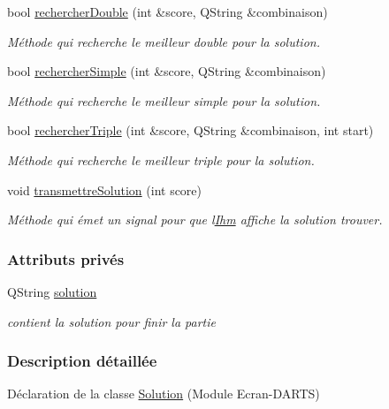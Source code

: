 \begin{DoxyCompactItemize}
bool \hyperlink{class_solution_aa54574bee5bde60d55a9da346a61cf48}{rechercher\+Double} (int \&score, Q\+String \&combinaison)
\begin{DoxyCompactList}\small\item\em Méthode qui recherche le meilleur double pour la solution. \end{DoxyCompactList}\item 
bool \hyperlink{class_solution_ab8223455a5a35aceb7de18970f94db48}{rechercher\+Simple} (int \&score, Q\+String \&combinaison)
\begin{DoxyCompactList}\small\item\em Méthode qui recherche le meilleur simple pour la solution. \end{DoxyCompactList}\item 
bool \hyperlink{class_solution_a7f3302e8292858a51795f08751d54ef9}{rechercher\+Triple} (int \&score, Q\+String \&combinaison, int start)
\begin{DoxyCompactList}\small\item\em Méthode qui recherche le meilleur triple pour la solution. \end{DoxyCompactList}\item 
void \hyperlink{class_solution_a334ffddf70bd379a0af7c7e93750d6b5}{transmettre\+Solution} (int score)
\begin{DoxyCompactList}\small\item\em Méthode qui émet un signal pour que l\textquotesingle{}\hyperlink{class_ihm}{Ihm} affiche la solution trouver. \end{DoxyCompactList}\end{DoxyCompactItemize}
\subsubsection*{Attributs privés}
\begin{DoxyCompactItemize}
\item 
Q\+String \hyperlink{class_solution_a03b47dedfe8a8f8244f7e633cbaa30fb}{solution}
\begin{DoxyCompactList}\small\item\em contient la solution pour finir la partie \end{DoxyCompactList}\end{DoxyCompactItemize}


\subsubsection{Description détaillée}
Déclaration de la classe \hyperlink{class_solution}{Solution} (Module Ecran-\/\+D\+A\+R\+TS) 

